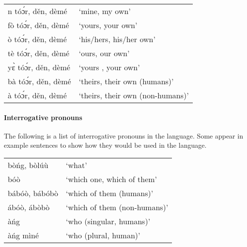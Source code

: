 \ea \label{ex:posspronouns} \begin{tabular}{ll} 
n tóɔ́r, děn, dèmé& ‘mine, my own’\\
fò tóɔ́r, děn, dèmé& ‘yours, your own’\\
ò tóɔ́r, děn, dèmé &‘his/hers, his/her own’\\
tè tóɔ́r, děn, dèmé& ‘ours, our own’\\
yɛ̀ tóɔ́r, děn, dèmé &‘yours , your own’\\
bà tóɔ́r, děn, dèmé &‘theirs, their own (humans)’\\
à tóɔ́r, děn, dèmé& ‘theirs, their own (non-humans)’\\
\end{tabular}\z



\ea {}
\z\z

\paragraph{Interrogative pronouns}
The following is a list of interrogative pronouns in the language. Some appear in example sentences to show how they would be used in the language.

\ea \label{ex:interrpronouns} \begin{tabular}{ll}  
bòńg, bòlúù& ‘what’\\
bóò& ‘which one, which of them’\\
bábóò, bábóbò& ‘which of them (humans)’\\
ábóò, ábòbò& ‘which of them (non-humans)’\\
àńg& ‘who (singular, humans)’\\
àńg mìné &‘who (plural, human)’\\
\end{tabular}\z


\ea \label{ex:interrpronounssents} 
\z\z

